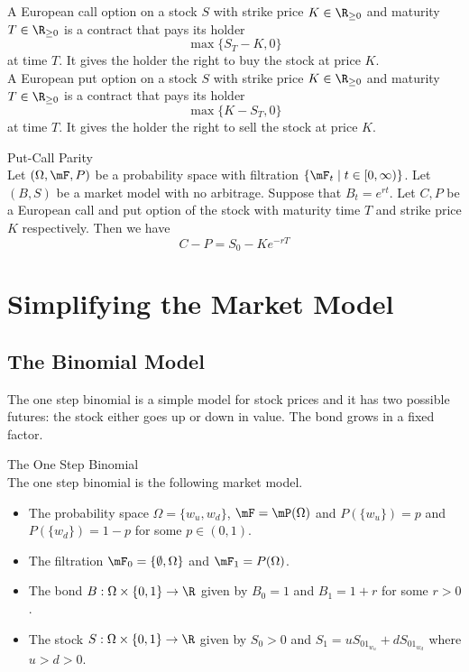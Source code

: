 \documentclass[a4paper]{article}
\begin{document}
A European call option on a stock $S$ with strike price $K\in\R_{\geq 0}$ and maturity $T\in\R_{\geq 0}$ is a contract that pays its holder $$\max\{S_T-K,0\}$$ at time $T$. It gives the holder the right to buy the stock at price $K$. \\

A European put option on a stock $S$ with strike price $K\in\R_{\geq 0}$ and maturity $T\in\R_{\geq 0}$ is a contract that pays its holder $$\max\{K-S_T,0\}$$ at time $T$. It gives the holder the right to sell the stock at price $K$. \\

\begin{thm}{Put-Call Parity}{}\\
Let $(\Omega,\mF,P)$ be a probability space with filtration $\{\mF_t\;|\;t\in[0,\infty)\}$. Let $(B,S)$ be a market model with no arbitrage. Suppose that $B_t=e^{rt}$. Let $C,P$ be a European call and put option of the stock with maturity time $T$ and strike price $K$ respectively. Then we have $$C-P=S_0-Ke^{-rT}$$
\end{thm}

\pagebreak
\section{Simplifying the Market Model}
\subsection{The Binomial Model}
The one step binomial is a simple model for stock prices and it has two possible futures: the stock either goes up or down in value. The bond grows in a fixed factor. 

\begin{defn}{The One Step Binomial}{}\\
The one step binomial is the following market model. 
\begin{itemize}
\item The probability space $\Omega=\{w_u,w_d\}$, $\mF=\mP(\Omega)$ and $P(\{w_u\})=p$ and $P(\{w_d\})=1-p$ for some $p\in(0,1)$. 
\item The filtration $\mF_0=\{\emptyset,\Omega\}$ and $\mF_1=P(\Omega)$. 
\item The bond $B:\Omega\times\{0,1\}\to\R$ given by $B_0=1$ and $B_1=1+r$ for some $r>0$. 
\item The stock $S:\Omega\times\{0,1\}\to\R$ given by $S_0>0$ and $S_1=uS_01_{w_u}+dS_01_{w_d}$ where $u>d>0$. 
\end{itemize}
\end{defn}
\end{document}
